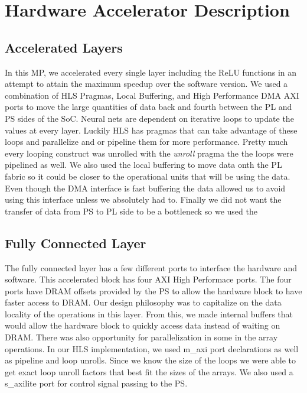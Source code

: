 \documentclass[10pt]{article}
\begin{document}
\section{Hardware Accelerator Description}
\subsection{Accelerated Layers}
In this MP, we accelerated every single layer including the ReLU functions in an attempt to attain the maximum speedup over the software version. We used a combination of HLS Pragmas, Local Buffering, and High Performance DMA AXI ports to move the large quantities of data back and fourth between the PL and PS sides of the SoC. Neural nets are dependent on iterative loops to update the values at every layer. Luckily HLS has pragmas that can take advantage of these loops and parallelize and or pipeline them for more performance. Pretty much every looping construct was unrolled with the \textit{unroll} pragma the the loops were pipelined as well. We also used the local buffering to move data onth the PL fabric so it could be closer to the operational units that will be using the data. Even though the DMA interface is fast buffering the data allowed us to avoid using this interface unless we absolutely had to. Finally we did not want the transfer of data from PS to PL side to be a bottleneck so we used the 

\subsection{Fully Connected Layer}
The fully connected layer has a few different ports to interface the hardware and software. This accelerated block has four AXI High Performace ports. The four ports have DRAM offsets provided by the PS to allow the hardware block to have faster access to DRAM. Our design philosophy was to capitalize on the data locality of the operations in this layer. From this, we made internal buffers that would allow the hardware block to quickly access data instead of waiting on DRAM. There was also opportunity for parallelization in some in the array operations. In our HLS implementation, we used m\_axi port declarations as well as pipeline and loop unrolls. Since we know the size of the loops we were able to get exact loop unroll factors that best fit the sizes of the arrays. We also used a s\_axilite port for control signal passing to the PS. 
\end{document}
